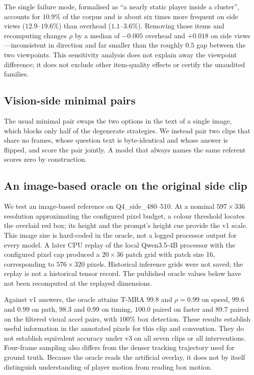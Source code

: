 \documentclass[11pt]{article}
\begin{document}
The single failure mode, formalised as ``a nearly static player inside a
cluster'', accounts for $10.9\%$ of the corpus and is about six times more
frequent on side views ($12.9$--$19.6\%$) than overhead ($1.1$--$3.6\%$).
Removing those items and recomputing changes $\rho$ by a median of $-0.005$
overhead and $+0.018$ on side views---inconsistent in direction and far smaller
than the roughly $0.5$ gap between the two viewpoints. This sensitivity analysis does not explain away the viewpoint difference;
it does not exclude other item-quality effects or certify the unaudited families.

\subsection{Vision-side minimal pairs}

The usual minimal pair swaps the two options in the text of a single image,
which blocks only half of the degenerate strategies. We instead pair two clips
that share no frames, whose question text is byte-identical and whose answer is
flipped, and score the pair jointly. A model that always names the same referent
scores zero by construction.

\subsection{An image-based oracle on the original side clip}
\label{sec:e0}

We test an image-based reference on Q4\_side\_480--510. At a nominal
$597\times336$ resolution approximating the configured pixel budget, a colour
threshold locates the overlaid red box; its height and the prompt's height cue
provide the v1 scale. This image size is hard-coded in the oracle, not a logged
processor output for every model. A later CPU replay of the local
Qwen3.5-4B processor with the configured pixel cap produced a $20\times36$
patch grid with patch size 16, corresponding to $576\times320$ pixels.
Historical inference grids were not saved; the replay is not a historical
tensor record. The published oracle values below have not been recomputed
at the replayed dimensions.

Against v1 answers, the oracle attains T-MRA $99.8$ and $\rho=0.99$ on speed,
$99.6$ and $0.99$ on path, $98.3$ and $0.99$ on timing, $100.0$ paired on faster
and $89.7$ paired on the filtered visual accel pairs, with $100\%$ box
detection. These results establish useful information in the annotated pixels
for this clip and convention. They do not establish equivalent accuracy under
v3 on all seven clips or all interventions. Four-frame sampling also differs
from the denser tracking trajectory used for ground truth. Because the oracle
reads the artificial overlay, it does not by itself distinguish understanding
of player motion from reading box motion.
\end{document}
